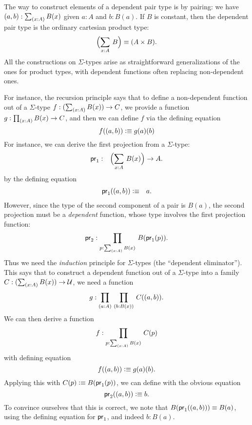 %
%
The way to construct elements of a dependent pair type is by pairing: we have
$\tup{a}{b} : \sm{x:A} B(x)$ given $a:A$ and $b:B(a)$.
If $B$ is constant, then the dependent pair type is the
ordinary cartesian product type:
\[ \Parens{\sm{x:A} B} \jdeq (A \times B).\]
All the constructions on $\Sigma$-types arise as straightforward generalizations of the ones for product types, with dependent functions often replacing non-dependent ones.

For instance, the recursion principle%
says that to define a non-dependent function out of a $\Sigma$-type
$f : (\sm{x:A} B(x)) \to C$, we provide a function 
$g : \prd{x:A} B(x) \to C$, and then we can define $f$ via the defining
equation
\[ f((a,b)) \vcentcolon\equiv g(a)(b) \]
%
For instance, we can derive the first projection from a $\Sigma$-type:
%
\begin{eqnarray*}
  \fst & : & \Parens{\sm{x : A}B(x)} \to A.
\end{eqnarray*}
by the defining equation
\begin{eqnarray*}
  \mathsf{pr}_{1}((a,b)) & \vcentcolon\equiv & a.
\end{eqnarray*}
However, since the type of the second component of a pair
is $B(a)$, the second projection must be a \emph{dependent} function, whose type involves the first projection function:
%
\[ \snd : \prd{p:\sm{x : A}B(x)}B(\fst(p)). \]
Thus we need the \emph{induction} principle%
for $\Sigma$-types (the ``dependent eliminator'').
This says that to construct a dependent function out of a $\Sigma$-type into a family $C : (\sm{x:A} B(x)) \to \UU$, we need a function
\[ g : \prd{a:A}{b:B(x)} C(\tup{a}{b}). \]
We can then derive a function 
\[ f : \prd{p : \sm{x:A}B(x)} C(p) \]
with  defining equation
\[ f((a,b)) \vcentcolon\equiv g(a)(b).\]
Applying this with $C(p)\vcentcolon\equiv B(\mathsf{pr}_{1}(p))$, we can define
with the obvious equation
\[ \mathsf{pr}_{2}((a,b))  \vcentcolon\equiv  b. \]
To convince ourselves that this is correct, we note that $B (\mathsf{pr}_{1}((a,b))) \equiv B(a)$, using the defining equation for $\mathsf{pr}_{1}$, and
indeed $b : B(a)$.

